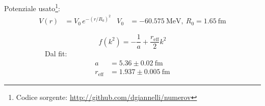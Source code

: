 \documentclass[12pt,a4paper]{article}
\begin{document}
Potenziale usato\footnote{Codice sorgente: \url{http://github.com/dgiannelli/numerov}}:
\begin{align*}
    V(r) &= V_0\,e^{-\left(r/R_0\right)^2} & V_0 &=-60.575\ \mathrm{MeV},\ R_0 = 1.65\ \mathrm{fm}
\end{align*}

\begin{figure}[htb]
    \centering
    \begin{subfigure}{.6\textwidth}
        \centering
    \end{subfigure}%
    \begin{subfigure}{.4\textwidth}
        \centering
        $$ f(k^2) = -\frac{1}{a} + \frac{r_\mathrm{eff}}{2}k^2 $$
        Dal fit:
        \begin{align*}
            a &= 5.36 \pm 0.02\ \mathrm{fm}\\
            r_\mathrm{eff} &= 1.937 \pm 0.005\ \mathrm{fm}
        \end{align*}
    \end{subfigure}
\end{figure}
\end{document}
